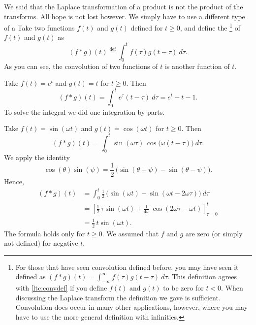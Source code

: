 We said that the Laplace transformation of a product is not the product
of the transforms.  All hope is not lost however.  We simply have to use
a different type of a 
Take
two functions $f(t)$ and $g(t)$ defined for $t \geq 0$,
and define the \emph{}%
\footnote{%
For those that have seen convolution defined before, you may have
seen it defined as
$(f * g)(t) =
\int_{-\infty}^\infty f(\tau) g(t-\tau) ~ d\tau$.  This definition
agrees with \eqref{ltc:convdef} if you define $f(t)$ and $g(t)$
to be zero for $t < 0$.
When discussing the Laplace transform the definition we gave is
sufficient.  Convolution does occur in many other applications, however,
where you may have to use the more general definition with infinities.
}
of $f(t)$ and $g(t)$ as
\begin{equation} \label{ltc:convdef}
\boxed{~~
(f * g)(t) \overset{\text{def}}{=}
\int_0^t f(\tau) g(t-\tau) ~ d\tau .
~~}
\end{equation}
As you can see, the convolution of two functions of $t$ is another function of $t$.


\begin{example}
Take $f(t) = e^t$ and $g(t) = t$ for $t \geq 0$.  Then 
\begin{equation*}
(f*g)(t)
=
\int_0^t e^\tau (t-\tau) ~ d\tau
=
e^t - t - 1 .
\end{equation*}
To solve the integral we
did one integration by parts.
\end{example}

\begin{example} \label{ltc:convsincosex}
Take $f(t) = \sin (\omega t)$ and $g(t) = \cos (\omega t)$ for $t \geq 0$.
Then 
\begin{equation*}
(f*g)(t)
=
\int_0^t  \sin ( \omega \tau ) \,
\cos \bigl( \omega (t-\tau) \bigr) ~ d\tau .
\end{equation*}
We apply the identity
\begin{equation*}
\cos (\theta) \sin (\psi) =
\frac{1}{2} \, \bigl( \sin (\theta + \psi) - \sin (\theta - \psi) \bigr) .
\end{equation*}
Hence,
\begin{equation*}
\begin{split}
(f*g)(t)
& =
\int_0^t
\frac{1}{2} \, \bigl( \sin (\omega t) - \sin (\omega t - 2 \omega \tau
) \bigr) ~ d\tau
\\
& =
\left[ \frac{1}{2} \, \tau  \sin (\omega t) + \frac{1}{4\omega} \, \cos (2 \omega \tau -
\omega t) \right]_{\tau=0}^t
\\
& = \frac{1}{2} \, t \sin (\omega t) .
\end{split}
\end{equation*}
The formula holds only for $t \geq 0$.  We assumed that $f$
and $g$ are zero (or simply not defined) for negative $t$.
\end{example}

